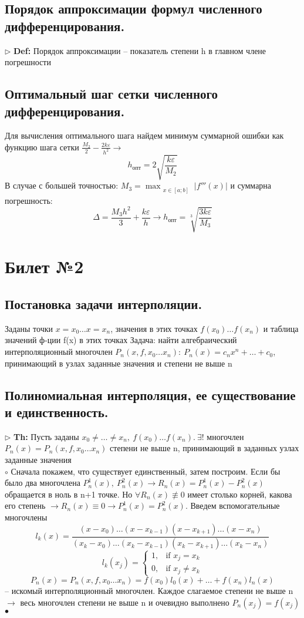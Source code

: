 \documentclass[a4paper]{article}
\begin{document}
\subsection{Порядок аппроксимации формул численного дифференцирования.}
$\triangleright$ \textbf{Def:} Порядок аппроксимации – показатель степени h в главном члене погрешности 
\subsection{Оптимальный шаг сетки численного дифференцирования.}
Для вычисления оптимального шага найдем минимум суммарной ошибки как функцию шага сетки $\frac{M_2}{2} - \frac{2k\varepsilon}{h^2} \rightarrow$
$$ h_{опт}=2 \sqrt{\frac{k\varepsilon}{M_2}} $$
В случае с большей точностью: $M_3=\max_{\substack{x \in [a;b]}} |f'''(x)|$ и суммарна погрешность:
$$ \Delta = \frac{M_3h^2}{3} + \frac{k\varepsilon}{h} \rightarrow h_{опт}=\sqrt[3]{\frac{3k\varepsilon}{M_3}}$$

\section{Билет №2}
\subsection{Постановка задачи интерполяции.}
Заданы точки $x=x_0 \ldots x=x_n$, значения в этих точках $f(x_0) \ldots f(x_n)$ и таблица значений ф-ции f(x) в этих точках
Задача: найти алгебраический интерполяционный многочлен $P_n(x,f,x_0 \ldots x_n): \ P_n(x) = c_nx^n + \ldots +c_0$, принимающий в узлах заданные значения и степени не выше n
\subsection{Полиномиальная интерполяция, ее существование и единственность.}
$\triangleright$ \textbf{Th:} Пусть заданы $x_0 \neq \ldots \neq x_n,\ f(x_0) \ldots f(x_n). \ \exists !$ многочлен $P_n(x) = P_n(x,f,x_0 \ldots x_n)$ степени не выше n, принимающий в заданных узлах заданные значения \\
	$\circ$ Сначала покажем, что существует единственный, затем построим.
	Если бы было два многочлена $P_n^1(x),\ P_n^2(x) \rightarrow R_n(x) = P_n^1(x)-P_n^2(x)$ обращается в ноль в n+1 точке. Но $\forall R_n(x) \not\equiv 0$ имеет столько корней, какова его степень $\rightarrow R_n(x) \equiv 0 \rightarrow P_n^1(x)=P_n^2(x)$.
	Введем вспомогательные многочлены $$l_k(x) = \frac{(x-x_0) \ldots (x-x_{k-1})(x-x_{k+1}) \ldots (x-x_n)}{(x_k-x_0) \ldots (x_k-x_{k-1})(x_k-x_{k+1}) \ldots (x_k-x_n)}$$ 
	$$l_k(x_j)=\begin{cases} 1,  & \mbox{if }x_j = x_k\\ 0, & \mbox{if }x_j \neq x_k \end{cases}$$
	$$P_n(x) = P_n(x,f,x_0 \ldots x_n) = f(x_0)l_0(x) + \ldots + f(x_n)l_n(x)$$ – искомый интерполяционный многочлен. Каждое слагаемое степени не выше n $\rightarrow$ весь многочлен степени не выше n и очевидно выполнено $P_n(x_j)=f(x_j)$
	$\bullet$
\end{document}
